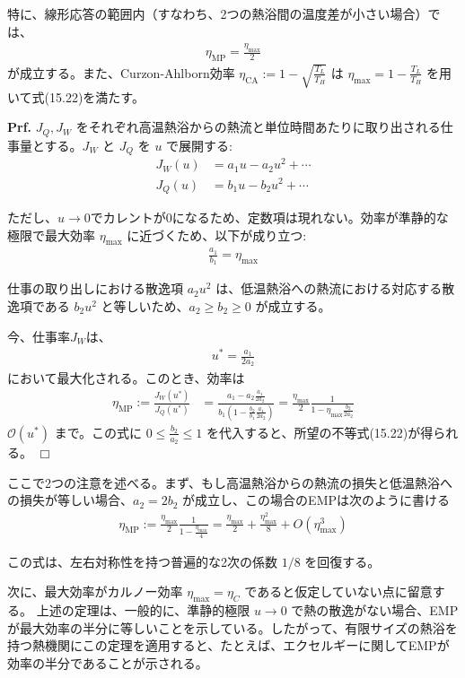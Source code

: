 \documentclass[a4paper,10.5pt]{jsarticle}
\numberwithin{equation}{section}
\begin{document}
特に、線形応答の範囲内（すなわち、2つの熱浴間の温度差が小さい場合）では、
\begin{align}
    \eta_{\text{MP}} = \frac{\eta_{\text{max}}}{2}
\end{align}
が成立する。また、Curzon-Ahlborn効率 $\eta_{\text{CA}} := 1 - \sqrt{\frac{T_L}{T_H}}$ は $\eta_{\text{max}} = 1 - \frac{T_L}{T_H}$ を用いて式(15.22)を満たす。

\textbf{Prf.} $J_Q,J_W$ をそれぞれ高温熱浴からの熱流と単位時間あたりに取り出される仕事量とする。$J_W$ と $J_Q$ を $u$ で展開する:
\begin{align}
    J_W(u) &= a_1 u - a_2 u^2 + \cdots \\
    J_Q(u) &= b_1 u - b_2 u^2 + \cdots
\end{align}

ただし、$u \to 0$でカレントが0になるため、定数項は現れない。効率が準静的な極限で最大効率 $\eta_{\text{max}}$ に近づくため、以下が成り立つ:
\begin{align}
    \frac{a_1}{b_1} = \eta_{\text{max}}
\end{align}

仕事の取り出しにおける散逸項 $a_2 u^2$ は、低温熱浴への熱流における対応する散逸項である $b_2 u^2$ と等しいため、$a_2 \geq b_2 \geq 0$ が成立する。

今、仕事率$J_W$は、
\begin{align}
    u^* = \frac{a_1}{2 a_2}
\end{align}
において最大化される。このとき、効率は
\begin{align}
    \eta_{\text{MP}} := \frac{J_W(u^*)}{J_Q(u^*)} &= \frac{a_1 - a_2 \frac{a_1}{2a_2}}{b_1 \left( 1 - \frac{b_2}{b_1} \frac{a_1}{2a_2} \right)} = \frac{\eta_{\text{max}}}{2} \frac{1}{1 - \eta_{\text{max}} \frac{b_2}{2a_2}}
\end{align}
$\mathcal{O}(u^*)$ まで。この式に $0 \leq \frac{b_2}{a_2} \leq 1$ を代入すると、所望の不等式(15.22)が得られる。 \hfill $\Box$

ここで2つの注意を述べる。まず、もし高温熱浴からの熱流の損失と低温熱浴への損失が等しい場合、$a_2 = 2 b_2$ が成立し、この場合のEMPは次のように書ける
\begin{align}
    \eta_{\text{MP}} := \frac{\eta_{\text{max}}}{2} \frac{1}{1 - \frac{\eta_{\text{max}}}{4}} = \frac{\eta_{\text{max}}}{2} + \frac{\eta_{\text{max}}^2}{8} + {O}(\eta_{\text{max}}^3)
\end{align}

この式は、左右対称性を持つ普遍的な2次の係数 $1/8$ を回復する。

次に、最大効率がカルノー効率 $\eta_{\text{max}} = \eta_C$ であると仮定していない点に留意する。
上述の定理は、一般的に、準静的極限 $u \to 0$ で熱の散逸がない場合、EMPが最大効率の半分に等しいことを示している。したがって、有限サイズの熱浴を持つ熱機関にこの定理を適用すると、たとえば、エクセルギーに関してEMPが効率の半分であることが示される。
\end{document}
